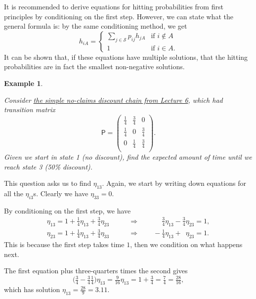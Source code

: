 \documentclass[
  a4paper,
]{article}
\theoremstyle{definition}
\theoremstyle{definition}
\newtheorem{example}{Example}[section]
\theoremstyle{definition}
\theoremstyle{remark}
\begin{document}
It is recommended to derive equations for hitting probabilities from first principles by conditioning on the first step. However, we can state what the general formula is: by the same conditioning method, we get
\[ h_{iA} = \begin{cases} \displaystyle\sum_{j \in \mathcal S} p_{ij} h_{jA} & \text{if $i \not\in A$} \\
1 & \text{if $i \in A$.} \end{cases} \]
It can be shown that, if these equations have multiple solutions, that the hitting probabilities are in fact the smallest non-negative solutions.

\begin{example}
\protect\hypertarget{exm:hitting2}{}\label{exm:hitting2}

\emph{Consider \protect\hyperlink{S06-example1}{the simple no-claims discount chain from Lecture 6}, which had transition matrix}
\[ \mathsf P =\begin{pmatrix}
    \tfrac14 &\tfrac34 & 0\\
    \tfrac14 &0 & \tfrac34\\
    0 &\tfrac14 & \tfrac34\\
    \end{pmatrix} .\]
\emph{Given we start in state 1 (no discount), find the expected amount of time until we reach state 3 (50\% discount).}

This question asks us to find \(\eta_{13}\). Again, we start by writing down equations for all the \(\eta_{i3}\)s. Clearly we have \(\eta_{33} = 0\).

By conditioning on the first step, we have
\begin{align*}
\eta_{13} = 1 + \tfrac14 \eta_{13} + \tfrac34 \eta_{23} \qquad &\Rightarrow \qquad \phantom{-}\tfrac34 \eta_{13} - \tfrac34\eta_{23} = 1 ,\\
\eta_{23} = 1 + \tfrac14 \eta_{13} + \tfrac34 \eta_{33} \qquad &\Rightarrow \qquad  - \tfrac14\eta_{13} + \phantom{\tfrac34}\eta_{23} = 1 .
\end{align*}
This is because the first step takes time \(1\), then we condition on what happens next.

The first equation plus three-quarters times the second gives
\[ \big(\tfrac34 - \tfrac34\tfrac14\big) \eta_{13} = \tfrac{9}{16}\eta_{13} = 1 + \tfrac34 = \tfrac 74 = \tfrac{28}{16} ,\]
which has solution \(\eta_{13} = \tfrac{28}{9} = 3.11\).

\end{example}
\end{document}
